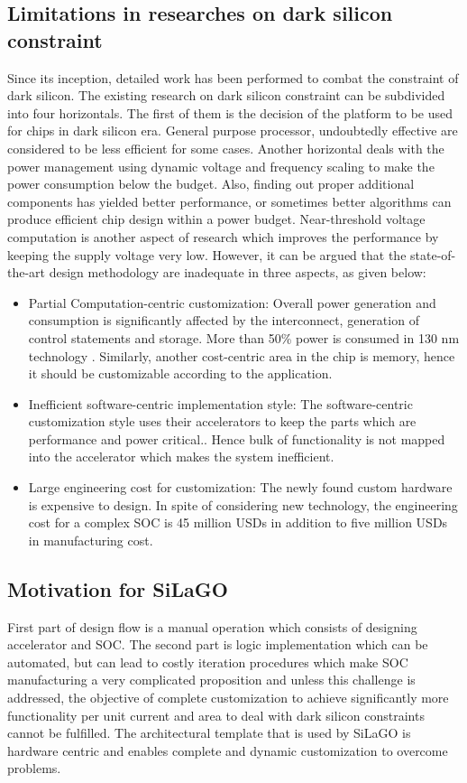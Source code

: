 \documentclass[journal]{IEEEtran}
\begin{document}
\subsection{Limitations in researches on dark silicon constraint}

Since its inception, detailed work has been performed to combat the constraint of dark silicon. The existing research on dark silicon constraint can be subdivided into four horizontals. The first of them is the decision of the platform to be used for chips in dark silicon era. General purpose processor, undoubtedly effective are considered to be less efficient for some cases. Another horizontal deals with the power management using dynamic voltage and frequency scaling to make the power consumption below the budget. Also, finding out proper additional components has yielded better performance, or sometimes better algorithms can produce efficient chip design within a power budget. Near-threshold voltage computation is another aspect of research which improves the performance by keeping the supply voltage very low. However, it can be argued that the state-of-the-art design methodology are inadequate in three aspects, as given below:

\begin{itemize}
\item Partial Computation-centric customization: Overall power generation and consumption is significantly affected by the interconnect, generation of control statements and storage. More than 50\% power is consumed in 130 nm technology \cite{paper3}. Similarly, another cost-centric area in the chip is memory, hence it should be customizable according to the application.

\item Inefficient software-centric implementation style: The software-centric customization style uses their accelerators to keep the parts which are performance and power critical.. Hence bulk of functionality is not mapped into the accelerator which makes the system inefficient. 

\item Large engineering cost for customization: The newly found custom hardware is expensive to design. In spite of considering new technology, the engineering cost for a complex SOC is 45 million USDs in addition to five million USDs in manufacturing cost.
\end{itemize}

\subsection{Motivation for SiLaGO}
First part of design flow is a manual operation which consists of designing accelerator and SOC. The second part is logic implementation which can be automated, but can lead to costly iteration procedures which make SOC manufacturing a very complicated proposition and unless this challenge is addressed, the objective of complete customization to achieve significantly more functionality per unit current and area to deal with dark silicon constraints cannot be fulfilled. The architectural template that is used by SiLaGO is hardware centric and enables complete and dynamic customization to overcome problems.
\end{document}
